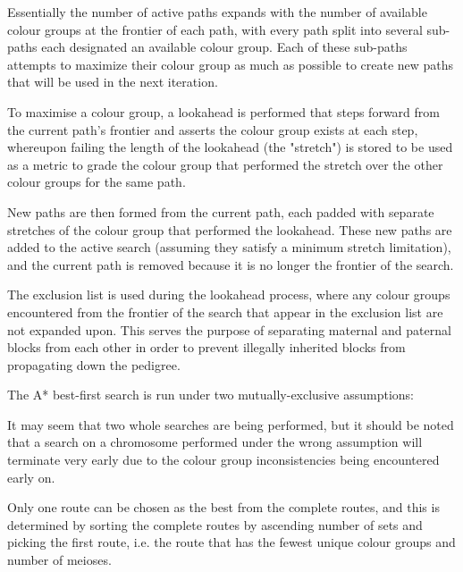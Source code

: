 Essentially the number of active paths expands with the number of available colour groups at the frontier of each path, with every path split into several sub-paths each designated an available colour group. Each of these sub-paths attempts to maximize their colour group as much as possible to create new paths that will be used in the next iteration.

To maximise a colour group, a lookahead is performed that steps forward from the current path's frontier and asserts the colour group exists at each step, whereupon failing the length of the lookahead (the "stretch") is stored to be used as a metric to grade the colour group that performed the stretch over the other colour groups for the same path. 

New paths are then formed from the current path, each padded with separate stretches of the colour group that performed the lookahead. These new paths are added to the active search (assuming they satisfy a minimum stretch limitation), and the current path is removed because it is no longer the frontier of the search.

The exclusion list is used during the lookahead process, where any colour groups encountered from the frontier of the search that appear in the exclusion list are not expanded upon. This serves the purpose of separating maternal and paternal blocks from each other in order to prevent illegally inherited  blocks from propagating down the pedigree.

The A* best-first search is run under two mutually-exclusive assumptions:
\begin{enumerate}
\end{enumerate}

It may seem that two whole searches are being performed, but it should be noted that a search on a chromosome performed under the wrong assumption will terminate very early due to the colour group inconsistencies being encountered early on.

Only one route can be chosen as the best from the complete routes, and this is determined by sorting the complete routes by ascending number of sets and picking the first route,  i.e. the route that has the fewest unique colour groups and number of meioses.


